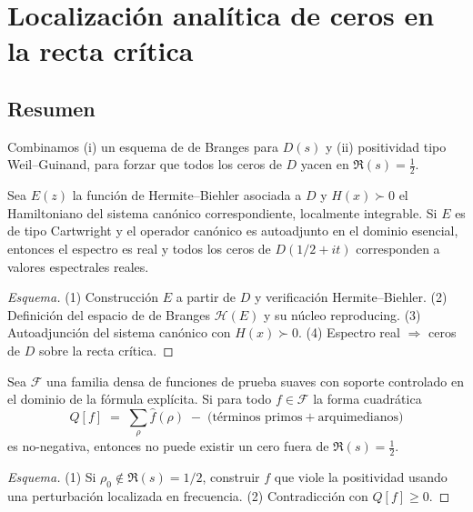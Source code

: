 \section{Localización analítica de ceros en la recta crítica}

\subsection*{Resumen}
Combinamos (i) un esquema de de Branges para $D(s)$ y (ii) positividad tipo
Weil--Guinand, para forzar que todos los ceros de $D$ yacen en $\Re(s)=\tfrac12$.

\begin{theorem}
Sea $E(z)$ la función de Hermite--Biehler asociada a $D$ y $H(x)\succ 0$ el Hamiltoniano
del sistema canónico correspondiente, localmente integrable. Si $E$ es de tipo Cartwright
y el operador canónico es autoadjunto en el dominio esencial, entonces el espectro es real
y todos los ceros de $D(1/2+it)$ corresponden a valores espectrales reales.
\end{theorem}

\begin{proof}[Esquema]
(1) Construcción $E$ a partir de $D$ y verificación Hermite--Biehler.
(2) Definición del espacio de de Branges $\mathcal{H}(E)$ y su núcleo reproducing.
(3) Autoadjunción del sistema canónico con $H(x)\succ 0$.
(4) Espectro real $\Rightarrow$ ceros de $D$ sobre la recta crítica.
\end{proof}

\begin{theorem}
Sea $\mathcal{F}$ una familia densa de funciones de prueba suaves con soporte
controlado en el dominio de la fórmula explícita. Si para todo $f\in \mathcal{F}$
la forma cuadrática
\[
Q[f] \;=\; \sum_\rho \widehat{f}(\rho)\;-\;\big(\text{términos primos}+\text{arquimedianos}\big)
\]
es no-negativa, entonces no puede existir un cero fuera de $\Re(s)=\tfrac12$.
\end{theorem}

\begin{proof}[Esquema]
(1) Si $\rho_0 \notin \Re(s)=1/2$, construir $f$ que viole la positividad usando
una perturbación localizada en frecuencia. (2) Contradicción con $Q[f]\ge 0$.
\end{proof}
